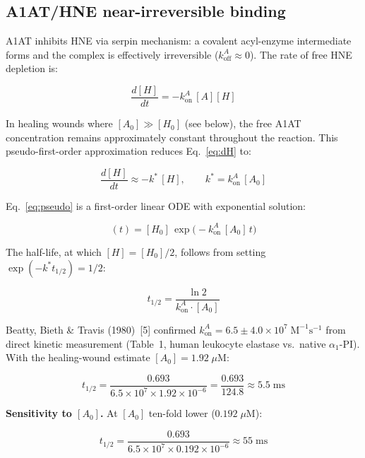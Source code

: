 \documentclass[10pt,a4paper]{article}
\numberwithin{equation}{section}
\newcommand{\kon}{k_{\text{on}}}
\newcommand{\koff}{k_{\text{off}}}
\newcommand{\Mms}{\text{M}^{-1}\text{s}^{-1}}
\newcommand{\cit}[1]{[#1]}   %
\begin{document}
\subsection{A1AT/HNE near-irreversible binding}

A1AT inhibits HNE via serpin mechanism: a covalent acyl-enzyme intermediate forms
and the complex is effectively irreversible ($\koff^A \approx 0$). The rate of free
HNE depletion is:

\begin{equation}
\frac{d[H]}{dt} = -\kon^A\,[A][H]
\label{eq:dH}
\end{equation}

In healing wounds where $[A_0] \gg [H_0]$ (see below), the free A1AT concentration
remains approximately constant throughout the reaction. This pseudo-first-order
approximation reduces Eq.~\eqref{eq:dH} to:

\begin{equation}
\frac{d[H]}{dt} \approx -k^*\,[H], \qquad k^* = \kon^A\,[A_0]
\label{eq:pseudo}
\end{equation}

Eq.~\eqref{eq:pseudo} is a first-order linear ODE with exponential solution:

\begin{equation}
[H](t) = [H_0]\,\exp\!\bigl(-\kon^A\,[A_0]\,t\bigr)
\label{eq:Hdecay}
\end{equation}

The half-life, at which $[H] = [H_0]/2$, follows from setting $\exp(-k^* t_{1/2}) = 1/2$:

\begin{equation}
t_{1/2} = \frac{\ln 2}{\kon^A\cdot[A_0]}
\label{eq:thalf}
\end{equation}

Beatty, Bieth \& Travis (1980)~\cit{5} confirmed $\kon^A = 6.5 \pm 4.0 \times 10^7\;\Mms$
from direct kinetic measurement (Table~1, human leukocyte elastase vs.\ native
$\alpha_1$-PI). With the healing-wound estimate $[A_0] = 1.92\;\mu\text{M}$:

\begin{equation}
t_{1/2} = \frac{0.693}{6.5 \times 10^7 \times 1.92 \times 10^{-6}}
= \frac{0.693}{124.8}
\approx 5.5\;\text{ms}
\label{eq:thalf_val}
\end{equation}

\textbf{Sensitivity to $[A_0]$.}
At $[A_0]$ ten-fold lower ($0.192\;\mu$M):

\begin{equation}
t_{1/2} = \frac{0.693}{6.5 \times 10^7 \times 0.192 \times 10^{-6}} \approx 55\;\text{ms}
\label{eq:thalf_lo}
\end{equation}
\end{document}

